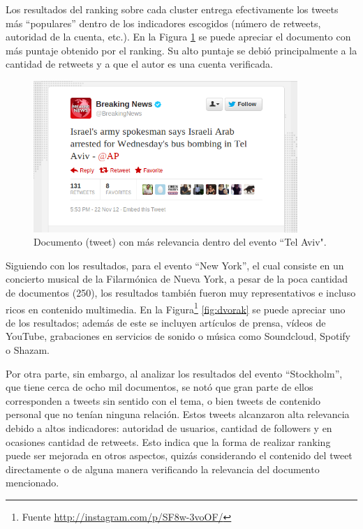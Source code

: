     Los resultados del ranking sobre cada cluster entrega
    efectivamente los tweets más ``populares'' dentro de los indicadores
    escogidos (número de retweets, autoridad de la cuenta, etc.). En
    la Figura \ref{fig:bn} se puede apreciar el documento con más
    puntaje obtenido por el ranking. Su alto puntaje se debió
    principalmente a la cantidad de retweets y a que el autor es una
    cuenta verificada.

\begin{figure}[h!]
  \centering
  \includegraphics[width=10cm]{./img/breakingnews.png}
  \caption[Documento con alto puntaje entre los resultados obtenidos]
   { Documento (tweet) con más relevancia dentro del evento ``Tel Aviv". \label{fig:bn} }
\end{figure}

    Siguiendo con los resultados, para el evento ``New York'', el cual consiste en un
    concierto musical de la Filarmónica de Nueva York, a pesar de la
    poca cantidad de documentos (250), los resultados también fueron
    muy representativos e incluso ricos en contenido multimedia. En la
    Figura\footnote{Fuente \href{http://instagram.com/p/SF8w-3voOF/}{http://instagram.com/p/SF8w-3voOF/} }
    \ref{fig:dvorak} se puede apreciar uno de los resultados; además
    de este se incluyen artículos de prensa, vídeos de YouTube,
    grabaciones en servicios de sonido o música como Soundcloud,
    Spotify o Shazam.

    Por otra parte, sin embargo, al analizar los resultados del evento
    ``Stockholm'', que tiene cerca de ocho mil documentos, se notó que
    gran parte de ellos corresponden a tweets sin sentido con el tema,
    o bien tweets de contenido personal que no tenían ninguna
    relación. Estos tweets alcanzaron alta relevancia debido a altos
    indicadores: autoridad de usuarios, cantidad de followers y en
    ocasiones cantidad de retweets. Esto indica que la forma de
    realizar ranking puede ser mejorada en otros aspectos, quizás
    considerando el contenido del tweet directamente o de alguna
    manera verificando la relevancia del documento mencionado.

